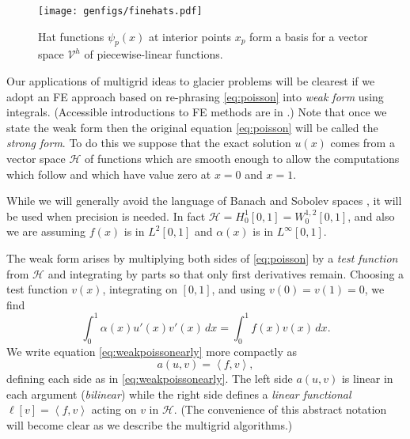 \documentclass[letterpaper,final,12pt,reqno]{amsart}
\newcommand{\ip}[2]{\left<#1,#2\right>}
\numberwithin{equation}{section}
\numberwithin{figure}{section}
\numberwithin{table}{section}
\begin{document}
\begin{figure}
\texttt{[image: genfigs/finehats.pdf]}
\caption{Hat functions $\psi_p(x)$ at interior points $x_p$ form a basis for a vector space $\mathcal{V}^h$ of piecewise-linear functions.}
\label{fig:finehats}
\end{figure}

Our applications of multigrid ideas to glacier problems will be clearest if we adopt an FE approach based on re-phrasing \eqref{eq:poisson} into \emph{weak form} using integrals.  (Accessible introductions to FE methods are in \cite{Bueler2021,Elmanetal2014,Johnson2009}.)  Note that once we state the weak form then the original equation \eqref{eq:poisson} will be called the \emph{strong form}.  To do this we suppose that the exact solution $u(x)$ comes from a vector space $\mathcal{H}$ of functions which are smooth enough to allow the computations which follow and which have value zero at $x=0$ and $x=1$.

While we will generally avoid the language of Banach and Sobolev spaces \cite[for example]{Evans2010}, it will be used when precision is needed.  In fact $\mathcal{H}=H_0^1[0,1]=W_0^{1,2}[0,1]$, and also we are assuming $f(x)$ is in $L^2[0,1]$ and $\alpha(x)$ is in $L^\infty[0,1]$.

The weak form arises by multiplying both sides of \eqref{eq:poisson} by a \emph{test function} from $\mathcal{H}$ and integrating by parts so that only first derivatives remain.  Choosing a test function $v(x)$, integrating on $[0,1]$, and using $v(0)=v(1)=0$, we find
\begin{equation}
\int_0^1 \alpha(x) u'(x) v'(x)\,dx = \int_0^1 f(x) v(x)\, dx.  \label{eq:weakpoissonearly}
\end{equation}
We write equation \eqref{eq:weakpoissonearly} more compactly as
\begin{equation}
  a(u,v) = \ip{f}{v}, \label{eq:weakpoisson}
\end{equation}
defining each side as in \eqref{eq:weakpoissonearly}.  The left side $a(u,v)$ is linear in each argument (\emph{bilinear}) while the right side defines a \emph{linear functional} $\ell[v] = \ip{f}{v}$ acting on $v$ in $\mathcal{H}$.  (The convenience of this abstract notation will become clear as we describe the multigrid algorithms.)
\end{document}
